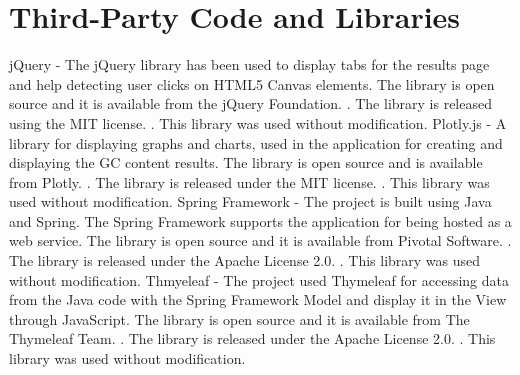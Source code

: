 \chapter{Third-Party Code and Libraries}





jQuery - The jQuery library has been used to display tabs for the results page and help detecting user clicks on HTML5 Canvas elements. The library is open source and it is available from the jQuery Foundation.
\cite{jquery}. The library is released using the MIT license.
\cite{mitlicense}. This library was used without modification.
\newline
Plotly.js - A library for displaying graphs and charts, used in the application for creating and displaying the GC content results. The library is open source and is available from Plotly.
\cite{plotly}. The library is released under the MIT license.
\cite{mitlicense}. This library was used without modification.
\newline
Spring Framework - The project is built using Java and Spring. The Spring Framework supports the application for being hosted as a web service. The library is open source and it is available from Pivotal Software.
\cite{spring}. The library is released under the Apache License 2.0.
\cite{apachelicense}. This library was used without modification.
\newline
Thmyeleaf - The project used Thymeleaf for accessing data from the Java code with the Spring Framework Model and display it in the View through JavaScript. The library is open source and it is available from The Thymeleaf Team.
\cite{thymeleaf}. The library is released under the Apache License 2.0.
\cite{apachelicense}. This library was used without modification.

